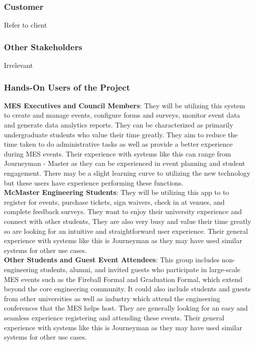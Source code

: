 \documentclass[12pt]{article}
\begin{document}
\subsubsection{Customer}
Refer to client
\subsubsection{Other Stakeholders}
Irrelevant
\subsubsection{Hands-On Users of the Project}
\textbf{MES Executives and Council Members}: They will be utilizing this system to create and manage events, configure forms and surveys, monitor event data and generate data analytics reports. They can be characterized as primarily undergraduate students who value their time greatly. They aim to reduce the time taken to do administrative tasks as well as provide a better experience during MES events. Their experience with systems like this can range from Journeyman - Master as they can be experienced in event planning and student engagement. There may be a slight learning curve to utilizing the new technology but these users have experience performing these functions.\\
\newline
\textbf{McMaster Engineering Students}: They will be utilizing this app to to register for events, purchase tickets, sign waivers, check in at venues, and complete feedback surveys. They want to enjoy their university experience and connect with other students, They are also very busy and value their time greatly so are looking for an intuitive and straightforward user experience. Their general experience with systems like this is Journeyman as they may have used similar systems for other use cases. \\
\newline
\textbf{Other Students and Guest Event Attendees}: This group includes non-engineering students, alumni, and invited guests who participate in large-scale MES events such as the Fireball Formal and Graduation Formal, which extend beyond the core engineering community. It could also include students and guests from other universities as well as industry which attend the engineering conferences that the MES helps host. They are generally looking for an easy and seamless experience registering and attending these events. Their general experience with systems like this is Journeyman as they may have used similar systems for other use cases.
\end{document}
